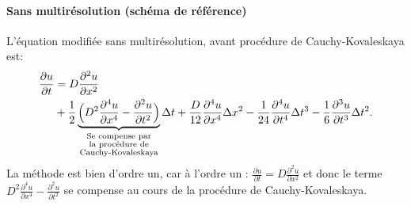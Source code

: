     \paragraph{Sans multirésolution (schéma de référence)}
        L'équation modifiée sans multirésolution, avant procédure de Cauchy-Kovaleskaya est:
        \begin{align}
            \frac{\partial u}{\partial t}  &= D \frac{\partial^{2} u}{\partial x^{2}} \\\notag
                &+ \frac{1}{2} \underbrace{\Bigl(D^{2}\frac{\partial^{4} u}{\partial x^{4}} - \frac{\partial^{2} u}{\partial t^{2}} \Bigr)}_{\substack{\text{Se compense par} \\ \text{la procédure de} \\ \text{Cauchy-Kovaleskaya}}} \Delta t
                + \frac{D}{12} \frac{\partial^{4} u}{\partial x^{4}}  \Delta x^{2}
                - \frac{1}{24} \frac{\partial^{4} u}{\partial t^{4}}  \Delta t^{3} 
                - \frac{1}{6}  \frac{\partial^{3} u}{\partial t^{3}}  \Delta t^{2}.
        \end{align}
        La méthode est bien d'ordre un, car à l'ordre un : $\frac{\partial u}{\partial t}  = D \frac{\partial^{2} u}{\partial x^{2}}$ et donc le terme $D^{2}\frac{\partial^{4} u}{\partial x^{4}} - \frac{\partial^{2} u}{\partial t^{2}}$
        se compense au cours de la procédure de Cauchy-Kovaleskaya.
